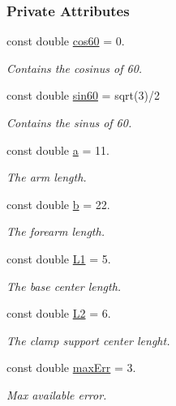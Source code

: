 \subsubsection*{Private Attributes}
\begin{DoxyCompactItemize}
\item 
const double \hyperlink{a00009_a86dc58ff23326f939cd6fb610ac90d53}{cos60} = 0.
\begin{DoxyCompactList}\small\item\em Contains the cosinus of 60. \end{DoxyCompactList}\item 
const double \hyperlink{a00009_aaa3e2dd194949b12f8a41ebd0d62fde9}{sin60} = sqrt(3)/2
\begin{DoxyCompactList}\small\item\em Contains the sinus of 60. \end{DoxyCompactList}\item 
const double \hyperlink{a00009_a7dc3998d380d61406fe4485f9872edff}{a} = 11.
\begin{DoxyCompactList}\small\item\em The arm length. \end{DoxyCompactList}\item 
const double \hyperlink{a00009_a14f03febaa39a60b9bf7ff9b9151060c}{b} = 22.
\begin{DoxyCompactList}\small\item\em The forearm length. \end{DoxyCompactList}\item 
const double \hyperlink{a00009_a6281142e50115dd8c914c14cfae6f90d}{L1} = 5.
\begin{DoxyCompactList}\small\item\em The base center length. \end{DoxyCompactList}\item 
const double \hyperlink{a00009_a3d51c16b1f498b48a6ecbfaadaba6ed2}{L2} = 6.
\begin{DoxyCompactList}\small\item\em The clamp support center lenght. \end{DoxyCompactList}\item 
const double \hyperlink{a00009_a3ecb7da23afe91883435f239bd08ceb3}{max\+Err} = 3.
\begin{DoxyCompactList}\small\item\em Max available error. \end{DoxyCompactList}\item 

\end{DoxyCompactItemize}
